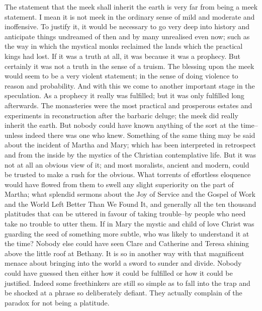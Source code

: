 The statement that the meek shall inherit the earth is very far from being a meek statement. I mean it is not meek in the ordinary sense of mild and moderate and inoffensive. To justify it, it would be necessary to go very deep into history and anticipate things undreamed of then and by many unrealised even now; such as the way in which the mystical monks reclaimed the lands which the practical kings had lost. If it was a truth at all, it was because it was a prophecy. But certainly it was not a truth in the sense of a truism. The blessing upon the meek would seem to be a very violent statement; in the sense of doing violence to reason and probability. And with this we come to another important stage in the speculation. As a prophecy it really was fulfilled; but it was only fulfilled long afterwards. The monasteries were the most practical and prosperous estates and experiments in reconstruction after the barbaric deluge; the meek did really inherit the earth. But nobody could have known anything of the sort at the time-- unless indeed there was one who knew. Something of the same thing may be said about the incident of Martha and Mary; which has been interpreted in retrospect and from the inside by the mystics of the Christian contemplative life. But it was not at all an obvious view of it; and most moralists, ancient and modern, could be trusted to make a rush for the obvious. What torrents of effortless eloquence would have flowed from them to swell any slight superiority on the part of Martha; what splendid sermons about the Joy of Service and the Gospel of Work and the World Left Better Than We Found It, and generally all the ten thousand platitudes that can be uttered in favour of taking trouble--by people who need take no trouble to utter them. If in Mary the mystic and child of love Christ was guarding the seed of something more subtle, who was likely to understand it at the time? Nobody else could have seen Clare and Catherine and Teresa shining above the little roof at Bethany. It is so in another way with that magnificent menace about bringing into the world a sword to sunder and divide. Nobody could have guessed then either how it could be fulfilled or how it could be justified. Indeed some freethinkers are still so simple as to fall into the trap and be shocked at a phrase so deliberately defiant. They actually complain of the paradox for not being a platitude.

